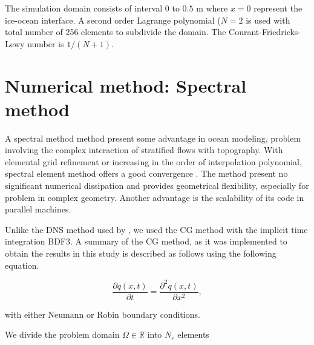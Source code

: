 \documentclass[11pt,a4paper]{article}
\begin{document}

	
	The simulation domain consists of interval $0$ to $0.5$ m where $x = 0$ represent the ice-ocean interface. A second order Lagrange polynomial ($N=2$ is used with total number of 256 elements to subdivide the domain. The Courant-Friedricks-Lewy number is $1/(N+1)$.
	
	\section{Numerical method: Spectral method}
	
	A spectral method method present some advantage in ocean modeling, problem involving the complex interaction of stratified flows with topography. With elemental grid refinement or increasing in the order of interpolation polynomial, spectral element method offers a good convergence \citep{ilicak2009non}. The method present no significant numerical dissipation and provides geometrical flexibility, especially for problem in complex geometry. Another advantage is the scalability of its code in parallel machines.
	
	Unlike the DNS method used by \cite{gayen2016simulation}, we used the CG method with the implicit time integration BDF3. A summary of the CG method, as it was implemented to obtain the results in this study is described as follows using the following equation.
	
	\begin{equation}
	    \dfrac{\partial q(x,t)}{\partial t} = \dfrac{\partial^2 q(x,t)}{\partial x^2},
	\end{equation}
	
	with either Neumann or Robin boundary conditions.
	
	We divide the problem domain $\Omega\in\mathbb{R}$ into $N_e$ elements
	
\end{document}
